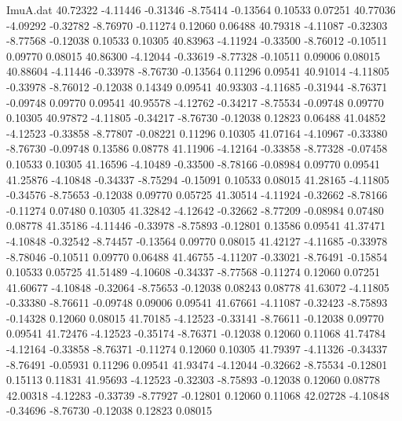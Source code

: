 \begin{filecontents}{ImuA.dat}
  40.72322   -4.11446   -0.31346   -8.75414   -0.13564    0.10533    0.07251
  40.77036   -4.09292   -0.32782   -8.76970   -0.11274    0.12060    0.06488
  40.79318   -4.11087   -0.32303   -8.77568   -0.12038    0.10533    0.10305
  40.83963   -4.11924   -0.33500   -8.76012   -0.10511    0.09770    0.08015
  40.86300   -4.12044   -0.33619   -8.77328   -0.10511    0.09006    0.08015
  40.88604   -4.11446   -0.33978   -8.76730   -0.13564    0.11296    0.09541
  40.91014   -4.11805   -0.33978   -8.76012   -0.12038    0.14349    0.09541
  40.93303   -4.11685   -0.31944   -8.76371   -0.09748    0.09770    0.09541
  40.95578   -4.12762   -0.34217   -8.75534   -0.09748    0.09770    0.10305
  40.97872   -4.11805   -0.34217   -8.76730   -0.12038    0.12823    0.06488
  41.04852   -4.12523   -0.33858   -8.77807   -0.08221    0.11296    0.10305
  41.07164   -4.10967   -0.33380   -8.76730   -0.09748    0.13586    0.08778
  41.11906   -4.12164   -0.33858   -8.77328   -0.07458    0.10533    0.10305
  41.16596   -4.10489   -0.33500   -8.78166   -0.08984    0.09770    0.09541
  41.25876   -4.10848   -0.34337   -8.75294   -0.15091    0.10533    0.08015
  41.28165   -4.11805   -0.34576   -8.75653   -0.12038    0.09770    0.05725
  41.30514   -4.11924   -0.32662   -8.78166   -0.11274    0.07480    0.10305
  41.32842   -4.12642   -0.32662   -8.77209   -0.08984    0.07480    0.08778
  41.35186   -4.11446   -0.33978   -8.75893   -0.12801    0.13586    0.09541
  41.37471   -4.10848   -0.32542   -8.74457   -0.13564    0.09770    0.08015
  41.42127   -4.11685   -0.33978   -8.78046   -0.10511    0.09770    0.06488
  41.46755   -4.11207   -0.33021   -8.76491   -0.15854    0.10533    0.05725
  41.51489   -4.10608   -0.34337   -8.77568   -0.11274    0.12060    0.07251
  41.60677   -4.10848   -0.32064   -8.75653   -0.12038    0.08243    0.08778
  41.63072   -4.11805   -0.33380   -8.76611   -0.09748    0.09006    0.09541
  41.67661   -4.11087   -0.32423   -8.75893   -0.14328    0.12060    0.08015
  41.70185   -4.12523   -0.33141   -8.76611   -0.12038    0.09770    0.09541
  41.72476   -4.12523   -0.35174   -8.76371   -0.12038    0.12060    0.11068
  41.74784   -4.12164   -0.33858   -8.76371   -0.11274    0.12060    0.10305
  41.79397   -4.11326   -0.34337   -8.76491   -0.05931    0.11296    0.09541
  41.93474   -4.12044   -0.32662   -8.75534   -0.12801    0.15113    0.11831
  41.95693   -4.12523   -0.32303   -8.75893   -0.12038    0.12060    0.08778
  42.00318   -4.12283   -0.33739   -8.77927   -0.12801    0.12060    0.11068
  42.02728   -4.10848   -0.34696   -8.76730   -0.12038    0.12823    0.08015

\end{filecontents}

